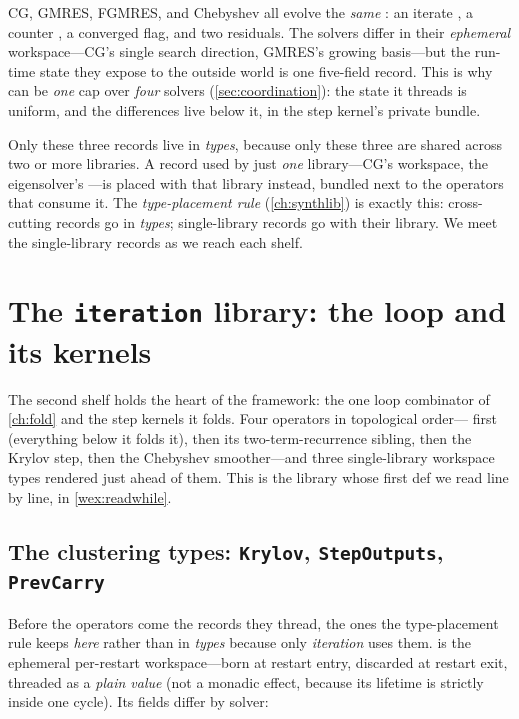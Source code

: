 \begin{keyidea}
CG, GMRES, FGMRES, and Chebyshev all evolve the \emph{same} : an
iterate , a counter , a converged flag, and two residuals. The
solvers differ in their \emph{ephemeral} workspace---CG's single search direction,
GMRES's growing basis---but the run-time state they expose to the outside world is
one five-field record. This is why  can be \emph{one} cap over
\emph{four} solvers (\cref{sec:coordination}): the state it threads is uniform, and
the differences live below it, in the step kernel's private  bundle.
\end{keyidea}

\begin{notationbox}
Only these three records live in \emph{types}, because only these three are shared
across two or more libraries. A record used by just \emph{one} library---CG's
 workspace, the eigensolver's ---is placed with that
library instead, bundled next to the operators that consume it. The
\emph{type-placement rule} (\cref{ch:synthlib}) is exactly this: cross-cutting
records go in \emph{types}; single-library records go with their library. We meet
the single-library records as we reach each shelf.
\end{notationbox}

\section{The \texttt{iteration} library: the loop and its kernels}
\label{sec:iteration}

The second shelf holds the heart of the framework: the one loop combinator of
\cref{ch:fold} and the step kernels it folds. Four operators in topological
order--- first (everything below it folds it), then its
two-term-recurrence sibling, then the Krylov step, then the Chebyshev smoother---and
three single-library workspace types rendered just ahead of them. This is the
library whose first def we read line by line, in \cref{wex:readwhile}.

\subsection{The clustering types: \texttt{Krylov}, \texttt{StepOutputs}, \texttt{PrevCarry}}

Before the operators come the records they thread, the ones the type-placement rule
keeps \emph{here} rather than in \emph{types} because only \emph{iteration} uses
them.  is the ephemeral per-restart workspace---born at restart entry,
discarded at restart exit, threaded as a \emph{plain value} (not a monadic effect,
because its lifetime is strictly inside one cycle). Its fields differ by solver:


